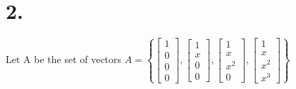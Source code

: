 \documentclass{article}
\begin{document}
\section*{2.}
Let A be the set of vectors 
$ A =
\left\{
\begin{bmatrix}
1 \\ 0 \\ 0 \\ 0
\end{bmatrix}
,
\begin{bmatrix}
1 \\ x \\ 0 \\ 0
\end{bmatrix}
,
\begin{bmatrix}
1 \\ x \\ x^2 \\ 0
\end{bmatrix}
,
\begin{bmatrix}
1 \\ x \\ x^2 \\ x^3
\end{bmatrix}
\right\}
$
\end{document}
